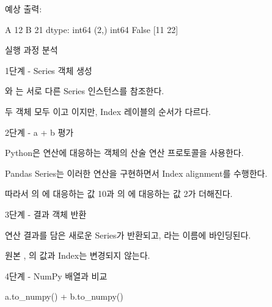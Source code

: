 예상 출력:

\begin{dhkzsh}
A    12
B    21
dtype: int64
(2,)
int64
False
[11 22]
\end{dhkzsh}

\begin{dhknote}
\begin{dhksmry}[centered]
실행 과정 분석
\end{dhksmry}
\end{dhknote}

\begin{dhknote}
\begin{dhksmry}[centered]
1단계 - Series 객체 생성
\end{dhksmry}
\end{dhknote}

와 는 서로 다른 Series 인스턴스를 참조한다.

두 객체 모두 이고  이지만, Index 레이블의 순서가 다르다.

\begin{dhknote}
\begin{dhksmry}[centered]
2단계 - a + b 평가
\end{dhksmry}
\end{dhknote}

Python은 \zsh{+} 연산에 대응하는 객체의 산술 연산 프로토콜을 사용한다.

Pandas Series는 이러한 연산을 구현하면서 Index alignment를 수행한다.

따라서 의 에 대응하는 값 10과 의 에 대응하는 값 2가 더해진다.

\begin{dhknote}
\begin{dhksmry}[centered]
3단계 - 결과 객체 반환
\end{dhksmry}
\end{dhknote}

연산 결과를 담은 새로운 Series가 반환되고, 라는 이름에 바인딩된다.

원본 , 의 값과 Index는 변경되지 않는다.

\begin{dhknote}
\begin{dhksmry}[centered]
4단계 - NumPy 배열과 비교
\end{dhksmry}
\end{dhknote}

\begin{dhkcode}
a.to_numpy() + b.to_numpy()
\end{dhkcode}

